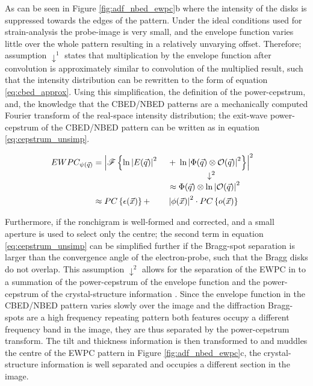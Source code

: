 As can be seen in Figure \ref{fig:adf_nbed_ewpc}b where the intensity of the disks is suppressed towards the edges of the pattern. Under the ideal conditions used for strain-analysis the probe-image is very small, and the envelope function varies little over the whole pattern resulting in a relatively unvarying offset. Therefore; assumption $\downarrow^1$ states that multiplication by the envelope function after convolution is approximately similar to convolution of the multiplied result, such that the intensity distribution can be rewritten to the form of equation \ref{eq:cbed_approx}. Using this simplification, the definition of the power-cepstrum, and, the knowledge that the CBED/NBED patterns are a mechanically computed Fourier transform of the real-space intensity distribution; the exit-wave power-cepstrum of the CBED/NBED pattern can be written as in equation \ref{eq:cepstrum_unsimp}.

\begin{alignat}{3}
	EWPC_{\psi(\vec{q})} & =\left| \mathscr{F}\left\{\ln{\left| E(\vec{q}) \right|^2}\right.\right. &  & +\left. \left.\ln{\left| \Phi(\vec{q}) \otimes \mathcal{O}(\vec{q}) \right|^2}\right\} \right|^2 & \label{eq:cepstrum_unsimp} \\
	\ArrowBetweenLines*[\downarrow^2\hspace{-2cm}]%
	                     &                                                                          &  & \approx \Phi(\vec{q}) \otimes \ln{\left| \mathcal{O}(\vec{q}) \right|^2}                         &                            \\
	                     & \approx PC\left\{ \epsilon(\vec{x})\right\}+                             &  & \left| \phi(\vec{x})\right|^2 \cdot PC\left\{ o(\vec{x})\right\}                                 & \label{eq:cepstrum_simp}
\end{alignat}

Furthermore, if the ronchigram is well-formed and corrected, and a small aperture is used to select only the centre; the second term in equation \ref{eq:cepstrum_unsimp} can be simplified further if the Bragg-spot separation is larger than the convergence angle of the electron-probe, such that the Bragg disks do not overlap. 
%
This assumption $\downarrow^2$ allows for the separation of the EWPC in to a summation of the power-cepstrum of the envelope function and the power-cepstrum of the crystal-structure information \cite{padgettExitwavePowercepstrumTransform2020}. 
%
Since the envelope function in the CBED/NBED pattern varies slowly over the image and the diffraction Bragg-spots are a high frequency repeating pattern both features occupy a different frequency band in the image, they are thus separated by the power-cepstrum transform. The tilt and thickness information is then transformed to and muddles the centre of the EWPC pattern in Figure \ref{fig:adf_nbed_ewpc}c, the crystal-structure information is well separated and occupies a different section in the image.

